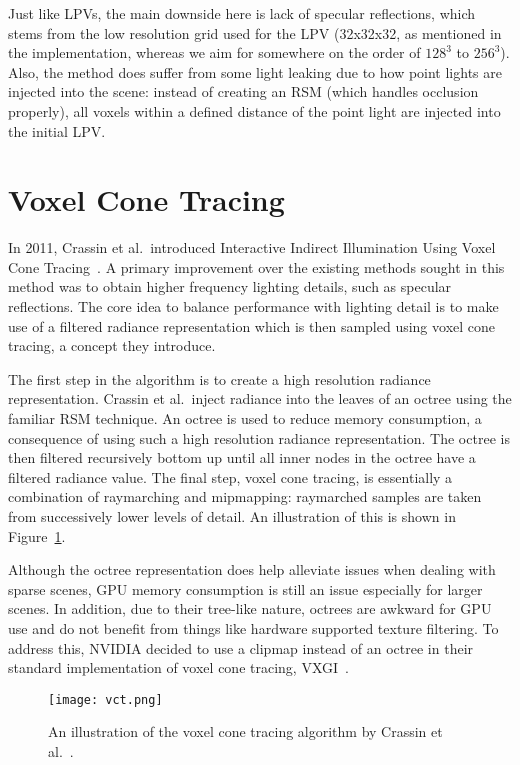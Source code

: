 Just like LPVs, the main downside here is lack of specular reflections, which stems from the low resolution grid used for the LPV (32x32x32, as mentioned in the implementation, whereas we aim for somewhere on the order of $128^3$ to $256^3$). Also, the method does suffer from some light leaking due to how point lights are injected into the scene: instead of creating an RSM (which handles occlusion properly), all voxels within a defined distance of the point light are injected into the initial LPV.

\section{Voxel Cone Tracing}
In 2011, Crassin et al.\ introduced Interactive Indirect Illumination Using Voxel Cone Tracing~\cite{crassin2011interactive}. A primary improvement over the existing methods sought in this method was to obtain higher frequency lighting details, such as specular reflections. The core idea to balance performance with lighting detail is to make use of a filtered radiance representation which is then sampled using voxel cone tracing, a concept they introduce.

The first step in the algorithm is to create a high resolution radiance representation. Crassin et al.\ inject radiance into the leaves of an octree using the familiar RSM technique. An octree is used to reduce memory consumption, a consequence of using such a high resolution radiance representation. The octree is then filtered recursively bottom up until all inner nodes in the octree have a filtered radiance value. The final step, voxel cone tracing, is essentially a combination of raymarching and mipmapping: raymarched samples are taken from successively lower levels of detail. An illustration of this is shown in Figure~\ref{fig:vct}.


Although the octree representation does help alleviate issues when dealing with sparse scenes, GPU memory consumption is still an issue especially for larger scenes. In addition, due to their tree-like nature, octrees are awkward for GPU use and do not benefit from things like hardware supported texture filtering. To address this, NVIDIA decided to use a clipmap instead of an octree in their standard implementation of voxel cone tracing, VXGI~\cite{nvidiavxgi}.

\begin{figure}[h]
    \centering
    \texttt{[image: vct.png]}
    \caption{An illustration of the voxel cone tracing algorithm by Crassin et al.~\cite{crassin2011interactive}.}
    \label{fig:vct}
\end{figure}


